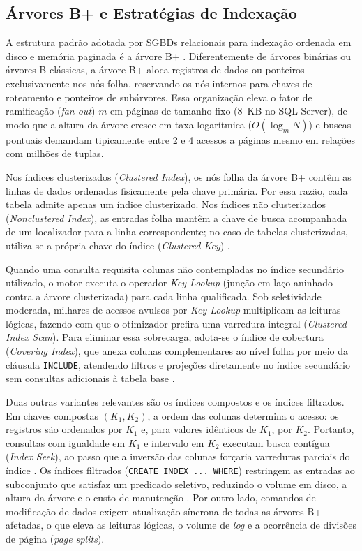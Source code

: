 \documentclass[12pt]{article}
\begin{document}
\subsection{Árvores B+ e Estratégias de Indexação}

A estrutura padrão adotada por SGBDs relacionais para indexação ordenada em disco e memória paginada é a árvore B+ \cite{comer:79,elmasri:16}. Diferentemente de árvores binárias ou árvores B clássicas, a árvore B+ aloca registros de dados ou ponteiros exclusivamente nos nós folha, reservando os nós internos para chaves de roteamento e ponteiros de subárvores. Essa organização eleva o fator de ramificação (\textit{fan-out}) $m$ em páginas de tamanho fixo (8~KB no SQL Server), de modo que a altura da árvore cresce em taxa logarítmica ($O(\log_m N)$) e buscas pontuais demandam tipicamente entre 2 e 4 acessos a páginas mesmo em relações com milhões de tuplas.

Nos índices clusterizados (\textit{Clustered Index}), os nós folha da árvore B+ contêm as linhas de dados ordenadas fisicamente pela chave primária. Por essa razão, cada tabela admite apenas um índice clusterizado. Nos índices não clusterizados (\textit{Nonclustered Index}), as entradas folha mantêm a chave de busca acompanhada de um localizador para a linha correspondente; no caso de tabelas clusterizadas, utiliza-se a própria chave do índice (\textit{Clustered Key}) \cite{microsoft:22}.

Quando uma consulta requisita colunas não contempladas no índice secundário utilizado, o motor executa o operador \textit{Key Lookup} (junção em laço aninhado contra a árvore clusterizada) para cada linha qualificada. Sob seletividade moderada, milhares de acessos avulsos por \textit{Key Lookup} multiplicam as leituras lógicas, fazendo com que o otimizador prefira uma varredura integral (\textit{Clustered Index Scan}). Para eliminar essa sobrecarga, adota-se o índice de cobertura (\textit{Covering Index}), que anexa colunas complementares ao nível folha por meio da cláusula \texttt{INCLUDE}, atendendo filtros e projeções diretamente no índice secundário sem consultas adicionais à tabela base \cite{silberschatz:20}.

Duas outras variantes relevantes são os índices compostos e os índices filtrados. Em chaves compostas $(K_1, K_2)$, a ordem das colunas determina o acesso: os registros são ordenados por $K_1$ e, para valores idênticos de $K_1$, por $K_2$. Portanto, consultas com igualdade em $K_1$ e intervalo em $K_2$ executam busca contígua (\textit{Index Seek}), ao passo que a inversão das colunas forçaria varreduras parciais do índice \cite{ramakrishnan:03}. Os índices filtrados (\texttt{CREATE INDEX ... WHERE}) restringem as entradas ao subconjunto que satisfaz um predicado seletivo, reduzindo o volume em disco, a altura da árvore e o custo de manutenção \cite{microsoft:22}. Por outro lado, comandos de modificação de dados exigem atualização síncrona de todas as árvores B+ afetadas, o que eleva as leituras lógicas, o volume de \textit{log} e a ocorrência de divisões de página (\textit{page splits}).
\end{document}

